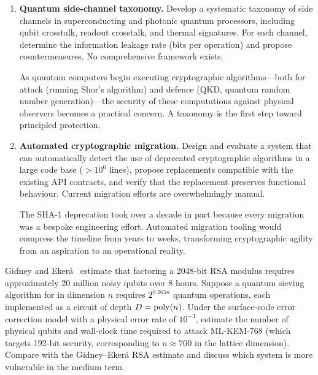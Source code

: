 \begin{enumerate}
\item \textbf{Quantum side-channel taxonomy.}
Develop a systematic taxonomy of side channels in superconducting and photonic quantum processors, including qubit crosstalk, readout crosstalk, and thermal signatures.  For each channel, determine the information leakage rate (bits per operation) and propose countermeasures.  No comprehensive framework exists.

As quantum computers begin executing cryptographic algorithms---both for attack (running Shor's algorithm) and defence (QKD, quantum random number generation)---the security of these computations against physical observers becomes a practical concern.  A taxonomy is the first step toward principled protection.

\item \textbf{Automated cryptographic migration.}
Design and evaluate a system that can automatically detect the use of deprecated cryptographic algorithms in a large code base ($> 10^6$ lines), propose replacements compatible with the existing API contracts, and verify that the replacement preserves functional behaviour.  Current migration efforts are overwhelmingly manual.

The SHA-1 deprecation took over a decade in part because every migration was a bespoke engineering effort.  Automated migration tooling would compress the timeline from years to weeks, transforming cryptographic agility from an aspiration to an operational reality.

\end{enumerate}



\begin{prob}
\label{prob:ch15-quantum-resource}
Gidney and Eker\aa~\cite{GidneyEkera2021} estimate that factoring a 2048-bit RSA modulus requires approximately 20 million noisy qubits over 8 hours.  Suppose a quantum sieving algorithm for \svp{} in dimension $n$ requires $2^{0.265n}$ quantum operations, each implemented as a circuit of depth $D = \operatorname{poly}(n)$.  Under the surface-code error correction model with a physical error rate of $10^{-3}$, estimate the number of physical qubits and wall-clock time required to attack ML-KEM-768 (which targets 192-bit security, corresponding to $n \approx 700$ in the lattice dimension).  Compare with the Gidney--Eker\aa{} RSA estimate and discuss which system is more vulnerable in the medium term.
\end{prob}

